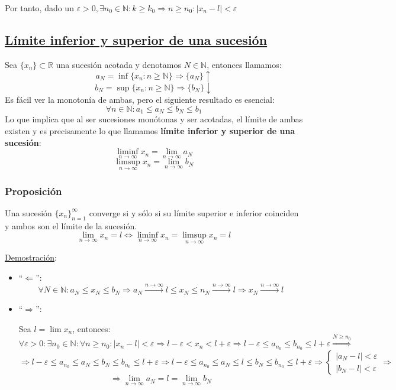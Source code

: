 \documentclass[10pt,a4paper,openright]{book}
\begin{document}
Por tanto, dado un $\varepsilon>0,\exists n_0\in \mathbb N: k\geq k_0\Rightarrow n\geq n_0: |x_n-l|<\varepsilon$

\subsection*{\underline{Límite inferior y superior de una sucesión}}
Sea $\{x_n\}\subset \mathbb R$ una sucesión acotada y denotamos $N\in \mathbb N$, entonces llamamos:
$$a_N=\inf\{x_n: n\geq \mathbb N\}\Rightarrow \{a_N\}\uparrow$$
$$b_N=\sup\{x_n: n\geq \mathbb N\}\Rightarrow \{b_N\}\downarrow$$
Es fácil ver la monotonía de ambas, pero el siguiente resultado es esencial:
$$\forall n\in \mathbb N: a_1\leq a_N\leq b_N\leq b_1$$
Lo que implica que al ser sucesiones monótonas y ser acotadas, el límite de ambas existen y es precisamente lo que llamamos \textbf{límite inferior y superior de una sucesión}:
$$\liminf_{n\rightarrow\infty}x_n=\lim_{n\rightarrow\infty}a_N$$
$$\limsup_{n\rightarrow\infty}x_n=\lim_{n\rightarrow\infty}b_N$$

\subsubsection*{Proposición}
Una sucesión $\{x_n\}_{n=1}^\infty$ converge si y sólo si su límite superior e inferior coinciden y ambos son el límite de la sucesión.
$$\lim_{n\rightarrow \infty}x_n=l\Leftrightarrow \liminf_{n\rightarrow\infty}x_n= \limsup_{n\rightarrow\infty}x_n=l$$

\underline{Demostración}:
\begin{itemize}
\item ``$\Leftarrow$'':
$$\forall N\in \mathbb N: a_N\leq x_N \leq b_N\Rightarrow a_N\xrightarrow{n\rightarrow\infty} l\leq x_N\leq n_N\xrightarrow{n\rightarrow\infty} l\Rightarrow x_N\xrightarrow{n\rightarrow\infty} l$$

\item ``$\Rightarrow$'':\par
Sea $l=\lim x_n$, entonces:
$$\forall \varepsilon>0: \exists n_0\in \mathbb N : \forall n\geq n_0: |x_n-l|<\varepsilon\Rightarrow l-\varepsilon <x_n<l+\varepsilon\Rightarrow l-\varepsilon \leq a_{n_0} \leq b_{n_0}\leq l+\varepsilon\stackrel{N\geq n_0}{\Rightarrow}$$
$$\Rightarrow l-\varepsilon \leq a_{n_0} \leq a_N \leq b_N \leq b_{n_0} \leq l+\varepsilon\Rightarrow l-\varepsilon \leq a_{n_0} \leq a_N \leq l\leq b_N \leq b_{n_0} \leq l+\varepsilon\Rightarrow \begin{cases}|a_N-l|<\varepsilon \\ |b_N-l|<\varepsilon \end{cases}\Rightarrow$$
$$\Rightarrow \lim_{n\rightarrow\infty}a_N=l= \lim_{n\rightarrow\infty}b_N$$
\end{itemize}
\end{document}
